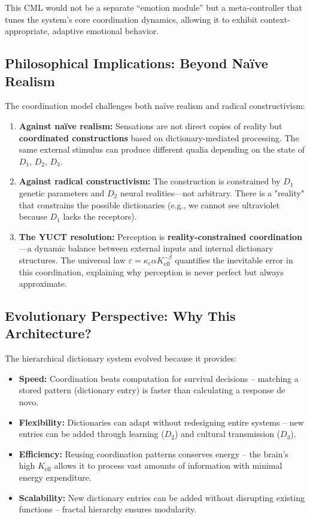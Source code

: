\documentclass[12pt,a4paper]{article}
\newcommand{\eff}{\mathrm{eff}}
\newcommand{\Ke}{K_{\eff}}
\begin{document}
	This CML would not be a separate ``emotion module'' but a meta-controller that tunes the system's core coordination dynamics, allowing it to exhibit context-appropriate, adaptive emotional behavior.
	
	\subsection{Philosophical Implications: Beyond Naïve Realism}
	
	The coordination model challenges both naïve realism and radical constructivism:
	
	\begin{enumerate}
		\item \textbf{Against naïve realism:} Sensations are not direct copies of reality but \textbf{coordinated constructions} based on dictionary-mediated processing. The same external stimulus can produce different qualia depending on the state of $D_1$, $D_2$, $D_3$.
		
		\item \textbf{Against radical constructivism:} The construction is constrained by $D_1$ genetic parameters and $D_2$ neural realities—not arbitrary. There is a "reality" that constrains the possible dictionaries (e.g., we cannot see ultraviolet because $D_1$ lacks the receptors).
		
		\item \textbf{The YUCT resolution:} Perception is \textbf{reality-constrained coordination}—a dynamic balance between external inputs and internal dictionary structures. The universal law \(\varepsilon = \kappa_c \alpha \Ke^{-\beta}\) quantifies the inevitable error in this coordination, explaining why perception is never perfect but always approximate.
	\end{enumerate}
	
	\subsection{Evolutionary Perspective: Why This Architecture?}
	
	The hierarchical dictionary system evolved because it provides:
	
	\begin{itemize}
		\item \textbf{Speed:} Coordination beats computation for survival decisions – matching a stored pattern (dictionary entry) is faster than calculating a response de novo.
		\item \textbf{Flexibility:} Dictionaries can adapt without redesigning entire systems – new entries can be added through learning ($D_2$) and cultural transmission ($D_3$).
		\item \textbf{Efficiency:} Reusing coordination patterns conserves energy – the brain's high $\Ke$ allows it to process vast amounts of information with minimal energy expenditure.
		\item \textbf{Scalability:} New dictionary entries can be added without disrupting existing functions – fractal hierarchy ensures modularity.
	\end{itemize}
	
\end{document}
